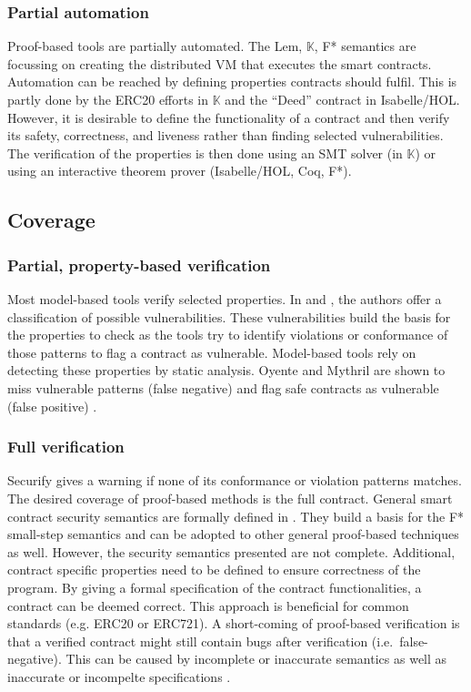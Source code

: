 \subsubsection{Partial automation}
Proof-based tools are partially automated. The Lem, $\mathbb{K}$, F* semantics are focussing on creating the distributed VM that executes the smart contracts. Automation can be reached by defining properties contracts should fulfil. This is partly done by the ERC20 efforts in $\mathbb{K}$ and the ``Deed'' contract in Isabelle/HOL. However, it is desirable to define the functionality of a contract and then verify its safety, correctness, and liveness rather than finding selected vulnerabilities. The verification of the properties is then done using an SMT solver (in $\mathbb{K}$) or using an interactive theorem prover (Isabelle/HOL, Coq, F*).

\subsection{Coverage} 
\subsubsection{Partial, property-based verification}
Most model-based tools verify selected properties. In \cite{Atzei2017} and \cite{Luu2016}, the authors offer a classification of possible vulnerabilities. These vulnerabilities build the basis for the properties to check as the tools try to identify violations or conformance of those patterns to flag a contract as vulnerable.
Model-based tools rely on detecting these properties by static analysis. 
Oyente and Mythril are shown to miss vulnerable patterns (false negative) and flag safe contracts as vulnerable (false positive) \cite{Tsankov2017}.

\subsubsection{Full verification}
Securify gives a warning if none of its conformance or violation patterns matches.
The desired coverage of proof-based methods is the full contract. 
General smart contract security semantics are formally defined in \cite{Grishchenko2018}. They build a basis for the F* small-step semantics and can be adopted to other general proof-based techniques as well.
However, the security semantics presented are not complete.
Additional, contract specific properties need to be defined to ensure correctness of the program.
By giving a formal specification of the contract functionalities, a contract can be deemed correct. This approach is beneficial for common standards (e.g. ERC20 or ERC721). 
A short-coming of proof-based verification is that a verified contract might still contain bugs after verification (i.e.\ false-negative). 
This can be caused by incomplete or inaccurate semantics as well as inaccurate or incompelte specifications \cite{Hirai2016}.

